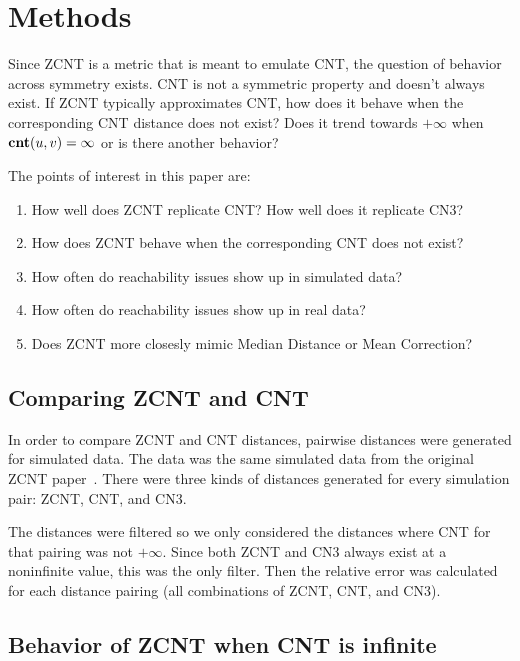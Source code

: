 \section{Methods}
Since ZCNT is a metric that is meant to emulate CNT, the question of behavior across symmetry exists. CNT is not a symmetric property and doesn't always exist. If ZCNT typically approximates CNT, how does it behave when the corresponding CNT distance does not exist? Does it trend towards $+\infty$ when $\textbf{cnt}(u, v) = \infty$ or is there another behavior?

\vspace{10pt}

\noindent The points of interest in this paper are: 

\begin{enumerate}\label{enumerate:questions}
    \item How well does ZCNT replicate CNT\@? How well does it replicate CN3?
    \item How does ZCNT behave when the corresponding CNT does not exist?
    \item How often do reachability issues show up in simulated data? 
    \item How often do reachability issues show up in real data? 
    \item Does ZCNT more closesly mimic Median Distance or Mean Correction?
\end{enumerate}

\subsection{Comparing ZCNT and CNT}\label{section:comp_dist}

In order to compare ZCNT and CNT distances, pairwise distances were generated for simulated data. The data was the same simulated data from the original ZCNT paper~\cite{zcnt_paper}. There were three kinds of distances generated for every simulation pair: ZCNT, CNT, and CN3. 

The distances were filtered so we only considered the distances where CNT for that pairing was not $+\infty$. Since both ZCNT and CN3 always exist at a noninfinite value, this was the only filter. Then the relative error was calculated for each distance pairing (all combinations of ZCNT, CNT, and CN3). 

\subsection{Behavior of ZCNT when CNT is infinite}\label{section:behavior}

